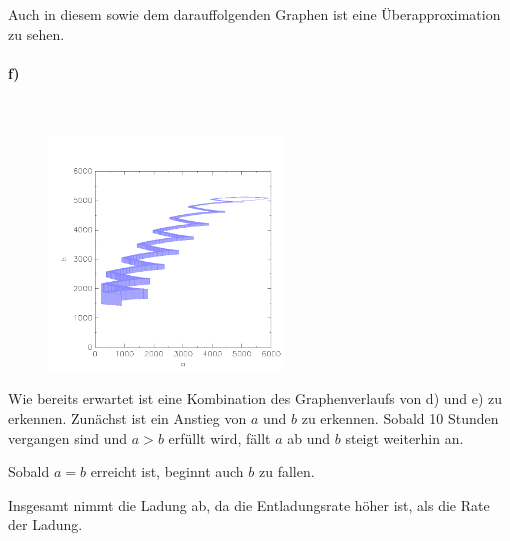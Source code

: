Auch in diesem sowie dem darauffolgenden Graphen ist eine Überapproximation zu sehen. 
\newpage

\paragraph{f)}\mbox{} \\

\begin{figure}[H]
	\centering
	\includegraphics[width=0.555\textwidth]{Aufgabe_f).png}
\end{figure} 

Wie bereits erwartet ist eine Kombination des Graphenverlaufs von d) und e) zu erkennen. Zunächst ist ein Anstieg von $a$ und $b$ zu erkennen. Sobald 10 Stunden vergangen sind und $a>b$ erfüllt wird, fällt $a$ ab und $b$ steigt weiterhin an. 

Sobald $a=b$ erreicht ist, beginnt auch $b$ zu fallen. 

Insgesamt nimmt die Ladung ab, da die Entladungsrate höher ist, als die Rate der Ladung.


